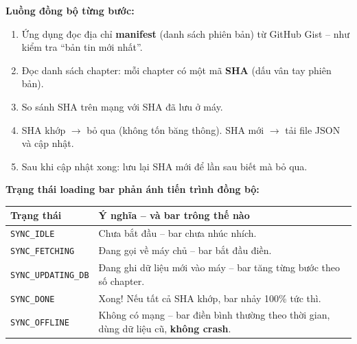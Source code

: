 \documentclass[12pt,a4paper]{article}
\begin{document}
\noindent{}

\vspace{6pt}
\noindent\textbf{Luồng đồng bộ từng bước:}

\begin{enumerate}
    \item Ứng dụng đọc địa chỉ \textbf{manifest} (danh sách phiên bản) từ
          GitHub Gist -- như kiểm tra “bản tin mới nhất”.
    \item Đọc danh sách chapter: mỗi chapter có một mã \textbf{SHA}
          (dấu vân tay phiên bản).
    \item So sánh SHA trên mạng với SHA đã lưu ở máy.
    \item SHA khớp $\rightarrow$ bỏ qua (không tốn băng thông).
          SHA mới $\rightarrow$ tải file JSON và cập nhật.
    \item Sau khi cập nhật xong: lưu lại SHA mới để lần sau biết mà bỏ qua.
\end{enumerate}

\noindent\textbf{Trạng thái loading bar phản ánh tiến trình đồng bộ:}

\vspace{4pt}
\begin{tabularx}{\linewidth}{|l|X|}
    \hline
    \textbf{Trạng thái}         & \textbf{Ý nghĩa -- và bar trông thế nào} \\
    \hline
    \texttt{SYNC\_IDLE}         & Chưa bắt đầu -- bar chưa nhúc nhích. \\
    \hline
    \texttt{SYNC\_FETCHING}     & Đang gọi về máy chủ -- bar bắt đầu điền. \\
    \hline
    \texttt{SYNC\_UPDATING\_DB} & Đang ghi dữ liệu mới vào máy -- bar tăng
                                  từng bước theo số chapter. \\
    \hline
    \texttt{SYNC\_DONE}         & Xong! Nếu tất cả SHA khớp, bar nhảy 100\%
                                  tức thì. \\
    \hline
    \texttt{SYNC\_OFFLINE}      & Không có mạng -- bar điền bình thường theo
                                  thời gian, dùng dữ liệu cũ, \textbf{không crash}. \\
    \hline
\end{tabularx}
\end{document}
